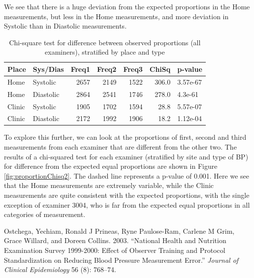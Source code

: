 \documentclass[
]{article}
\newlength{\cslhangindent}
\newlength{\cslentryspacingunit} %
\newenvironment{CSLReferences}[2] %
 {%
  \setlength{\parindent}{0pt}
  \ifodd #1
  \let\oldpar\par
  \def\par{\hangindent=\cslhangindent\oldpar}
  \fi
  \setlength{\parskip}{#2\cslentryspacingunit}
 }%
 {}
\begin{document}
We see that there is a huge deviation from the expected proportions in the Home measurements, but less in the Home measurements, and more deviation in Systolic than in Diastolic measurements.

\begin{table}[!h]

\caption{\label{tab:proportionChisq}Chi-square test for difference between observed proportions (all examiners), stratified by place and type}
\centering
\begin{tabular}[t]{llrrrrl}
\toprule
Place & Sys/Dias & Freq1 & Freq2 & Freq3 & ChiSq & p-value\\
\midrule
Home & Systolic & 2657 & 2149 & 1522 & 306.0 & 3.57e-67\\
Home & Diastolic & 2864 & 2541 & 1746 & 278.0 & 4.3e-61\\
Clinic & Systolic & 1905 & 1702 & 1594 & 28.8 & 5.57e-07\\
Clinic & Diastolic & 2172 & 1992 & 1906 & 18.2 & 1.12e-04\\
\bottomrule
\end{tabular}
\end{table}

To explore this further, we can look at the proportions of first, second and third measurements from each examiner that are different from the other two.
The results of a chi-squared test for each examiner (stratified by site and type of BP) for difference from the expected equal proportions are shown in Figure \ref{fig:proportionChisq2}.
The dashed line represents a p-value of 0.001.
Here we see that the Home measurements are extremely variable, while the Clinic measurements are quite consistent with the expected proportions, with the single exception of examiner 3004, who is far from the expected equal proportions in all categories of measurement.

\hypertarget{refs}{}
\begin{CSLReferences}{1}{0}
\leavevmode{}%
Ostchega, Yechiam, Ronald J Prineas, Ryne Paulose-Ram, Carlene M Grim, Grace Willard, and Doreen Collins. 2003. {``National Health and Nutrition Examination Survey 1999-2000: Effect of Observer Training and Protocol Standardization on Reducing Blood Pressure Measurement Error.''} \emph{Journal of Clinical Epidemiology} 56 (8): 768--74.

\end{CSLReferences}
\end{document}
